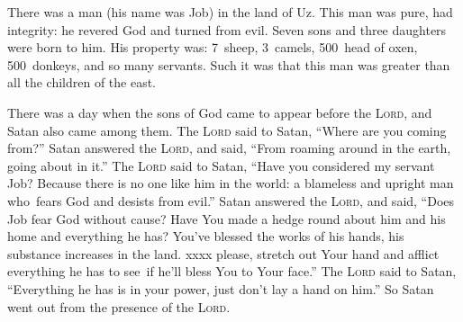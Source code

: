 
\begin{inparaenum}
     There was a man (his name was Job) in the land of Uz. This man was pure, had integrity: he revered God and turned from evil.%
     Seven sons and three daughters were born to him.%
     His property was: 7~sheep, 3~camels, 500~head of oxen, 500~donkeys, and so many servants. Such it was that this man was greater than all the children of the east.%
    
     There was a day when the sons of God came to appear before the \textsc{Lord}, and Satan also came among them.%
     The \textsc{Lord} said to Satan, ``Where are you coming from?'' Satan answered the \textsc{Lord}, and said, ``From roaming around in the earth, going about in it.''%
     The \textsc{Lord} said to Satan, ``Have you considered my servant Job? Because there is no one like him in the world: a blameless and upright man who\understood\ fears God and desists from evil.''%
     Satan answered the \textsc{Lord}, and said, ``Does Job fear God without cause?%
     Have You made a hedge round about him and his home and everything he has? You've blessed the works of his hands, his substance increases in the land.%
     xxxx please, stretch out Your hand and afflict everything he has to see\understood\ if he'll bless You to Your face.''%
     The \textsc{Lord} said to Satan, ``Everything he has is in your power, just don't lay a hand on him.'' So Satan went out from the presence of the \textsc{Lord}.%
    
     \smallskip%
    
    \pvba{}%
    
    \pvba{}%
    

\end{inparaenum}
